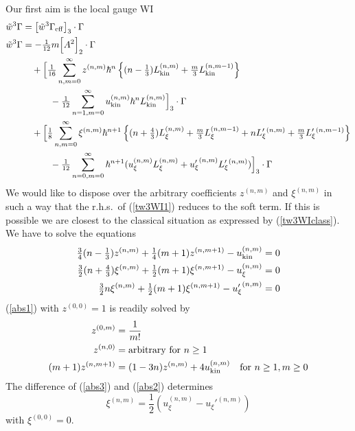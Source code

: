 \documentclass[a4paper,12pt]{article}
\newcommand{\half}{{\textstyle \frac{1}{2}}}
\def\quar{{\textstyle \frac{1}{4}}}
\newcommand{\Geff}{\Gamma_{\rm eff}}
\newcommand{\Lkin}{L_{\rm kin}}
\newcommand{\Lxi}{L_{\xi}}
\newcommand{\Lxib}{L_{\xi}'{}}
\newcommand{\ukin}{u_{\rm kin}}
\newcommand{\uxi}{u_{\xi}}
\newcommand{\uxib}{{u_{\xi}'}}
\newcommand{\tfr}[2]{{\textstyle \frac{#1}{#2}}}
\begin{document}
Our first aim is the local gauge WI
\begin{align}
\tilde w^3 \Gamma &=  \left[ \tilde w^3 \Geff\right]_3\cdot \Gamma\\
\tilde w^3 \Gamma &=  -  \tfr{1}{12}  m \Bigl[ A^2 \Bigr]_2 \cdot
\Gamma \nonumber \\
& \quad +\Bigl[ \tfr{1}{16}\sum_{n,m=0}^\infty
  z^{(n,m)} \hbar^n \left\{(n-\tfr{1}{3}) \Lkin^{(n,m)} +\tfr{m}{3} 
  \Lkin^{(n,m-1)}\right\} \nonumber \\
&\quad\quad\quad -\tfr{1}{12} \sum_{n=1,m=0}^\infty \ukin^{(n,m)}
  \hbar^n \Lkin^{(n,m)} \Bigr]_3\cdot\Gamma \nonumber \\
&\quad + \Bigl[ \tfr{1}{8} \sum_{n,m=0}^\infty \xi^{(n,m)} \hbar^{n+1}
  \left\{ (n+\tfr{4}{3})\Lxi^{(n,m)} +\tfr{m}{3} \Lxi^{(n,m-1)} + n
  \Lxib^{(n,m)}  +\tfr{m}{3} \Lxib^{(n,m-1)} \right\} \nonumber \\
&\quad\quad\quad - \tfr{1}{12} \sum_{n=0,m=0}^\infty
  \hbar^{n+1} (\uxi^{(n,m)} \Lxi^{(n,m)} +  \uxib^{(n,m)} \Lxib^{(n,m)})
  \Bigr]_3\cdot\Gamma 
\label{tw3WI1}
\end{align}
We would like to dispose over the arbitrary coefficients $z^{(n,m)}$ and
$\xi^{(n,m)}$ in such a way that the r.h.s.\ of (\ref{tw3WI1}) reduces to
the soft term. If this is possible we are closest to the classical
situation as expressed by (\ref{tw3WIclass}). 
We have to solve the equations
\begin{align}
\tfr{3}{4} (n-\tfr{1}{3}) z^{(n,m)} + \quar (m+1) z^{(n,m+1)} -
\ukin^{(n,m)}&=0 \label{abs1}\\
\tfr{3}{2}(n+\tfr{4}{3}) \xi^{(n,m)} +\half(m+1) \xi^{(n,m+1)} -\uxi^{(n,m)}&=0 \label{abs2}\\
\tfr{3}{2} n \xi^{(n,m)}  +\half(m+1) \xi^{(n,m+1)}  -\uxib^{(n,m)}&=0 \label{abs3}
\end{align}
(\ref{abs1}) with $z^{(0,0)}=1$ is readily solved by
\begin{align}
z^{(0,m)} &= \frac{1}{m!} \label{zclass}\\
z^{(n,0)} & = \text{arbitrary for } n\ge 1\\
(m+1) z^{(n,m+1)} &= (1-3n) z^{(n,m)}
+4 \ukin^{(n,m)} 
\quad \text{for }n\ge 1, m\ge 0 \label{zsolv}
\end{align}
The difference of (\ref{abs3}) and (\ref{abs2}) determines
\begin{equation}
\xi^{(n,m)} = \half ( \uxi^{(n,m)} - \uxib^{(n,m)} ) \label{xisolve}
\end{equation}
with $\xi^{(0,0)}=0$.
\end{document}
